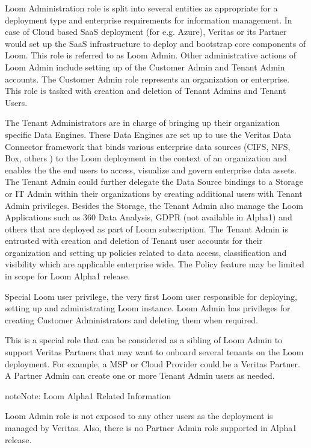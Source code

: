 \documentclass[letterpaper,10pt,english]{sphinxmanual}
\begin{document}
Loom Administration role is split into several entities as appropriate for a deployment type and enterprise requirements for information management.  In case of Cloud based SaaS deployment (for e.g. Azure), Veritas or its Partner would set up the SaaS infrastructure to deploy and bootstrap core components of Loom. This role is referred to as Loom Admin.  Other administrative actions of Loom Admin include setting up of the Customer Admin and Tenant Admin accounts.  The Customer Admin role represents an organization or enterprise. This role is tasked with creation and deletion of Tenant Admins and Tenant Users.

The Tenant Administrators are in charge of bringing up their organization specific Data Engines. These Data Engines are set up to use the Veritas Data Connector framework that binds various enterprise data sources (CIFS, NFS, Box, others ) to the Loom deployment in the context of an organization and enables the the end users to access, visualize and govern enterprise data assets. The Tenant Admin could further delegate the Data Source bindings to a Storage or IT Admin within their organizations by creating additional users with Tenant Admin privileges.  Besides the Storage, the Tenant Admin also manage the Loom Applications such as 360 Data Analysis,  GDPR (not available in Alpha1) and others that are deployed as part of Loom subscription. The Tenant Admin is entrusted with creation and deletion of Tenant user accounts for their organization and setting up policies related to data access, classification and visibility which are applicable enterprise wide. The Policy feature may be limited in scope for Loom Alpha1 release.

 Special Loom user privilege, the very first Loom user responsible for deploying, setting up and administrating Loom instance. Loom Admin has privileges for creating Customer Administrators and deleting them when required.

 This is a special role that can be considered as a sibling of Loom Admin to support Veritas Partners that may want to onboard several tenants on the Loom deployment.  For example, a MSP or Cloud Provider could be a Veritas Partner.  A Partner Admin can create one or more Tenant Admin users as needed.

\begin{sphinxadmonition}{note}{Note:}
Loom Alpha1 Related Information

Loom Admin role is not exposed to any other users as the deployment is managed by Veritas. Also, there is no Partner Admin role supported in Alpha1 release.
\end{sphinxadmonition}
\end{document}
